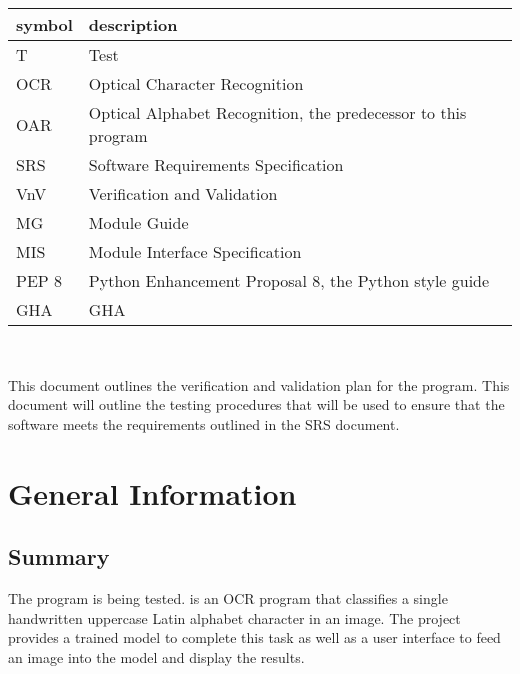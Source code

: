 \documentclass[12pt, titlepage]{article}
\begin{document}
\renewcommand{\arraystretch}{1.2}
\begin{tabular}{l l} 
  \toprule		
  \textbf{symbol} & \textbf{description}\\
  \midrule 
  T & Test\\
  OCR & Optical Character Recognition\\
  OAR & Optical Alphabet Recognition, the predecessor to this program\\
  SRS & Software Requirements Specification\\
  VnV & Verification and Validation\\
  MG & Module Guide\\
  MIS & Module Interface Specification\\
  PEP 8 & Python Enhancement Proposal 8, the Python style guide\\
  GHA & GHA\\
  \bottomrule
\end{tabular}\\



\newpage


This document outlines the verification and validation plan for the \progname{}
program. This document will outline the testing procedures that will be used to
ensure that the software meets the requirements outlined in the SRS document.

\section{General Information}

\subsection{Summary}

The \progname{} program is being tested. \progname{} is an OCR program that classifies
a single handwritten uppercase Latin alphabet character in an image. The project
provides a trained model to complete this task as well as a user interface to
feed an image into the model and display the results.

\end{document}
